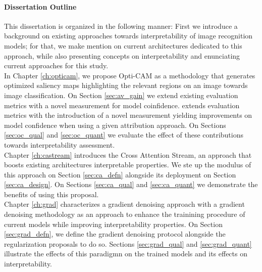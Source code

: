 
\paragraph{Dissertation Outline}
\noindent This dissertation is organized in the following manner: First we introduce a background 
on existing approaches towards interpretability of image recognition models; for that, we make 
mention on  current architectures dedicated to this approach, while also presenting concepts on 
interpretability and enunciating current approaches for this study. \\

\noindent In Chapter \ref{ch:opticam}, we propose Opti-CAM as a methodology that generates 
optimized saliency maps highlighting the relevant regions on an image towards image classification. 
On Section \ref{sec:av_gain} we extend existing evaluation metrics with a novel measurement for 
model coinfidence. extends evaluation metrics with the introduction of a novel measurement yielding
 improvements on model confidence when using a given attribution approach. 
On Sections \ref{sec:oc_qual} and \ref{sec:oc_quant} we evaluate the effect of these contributions 
towards interpretability assessment.\\

\noindent Chapter \ref{ch:castream} introduces the Cross Attention Stream, an approach that boosts existing 
architectures interpretable properties. We ste up the modulus of this approach on 
Section \ref{sec:ca_defn} alongside its deployment on Section \ref{sec:ca_design}. 
On Sections \ref{sec:ca_qual} and \ref{sec:ca_quant} we demonstrate the benefits of using this
proposal.\\

\noindent Chapter \ref{ch:grad} characterizes a gradient denoising approach with a gradient denoising 
methodology as an approach to enhance the trainining procedure of current models while improving 
interpretability properties. On Section \ref{sec:grad_defn}, we define the gradient denoising 
protocol alongside the regularization proposals to do so.
Sections \ref{sec:grad_qual} and \ref{sec:grad_quant} illustrate the effects of this paradigmn
on the trained models and its effects on interpretability.\\

